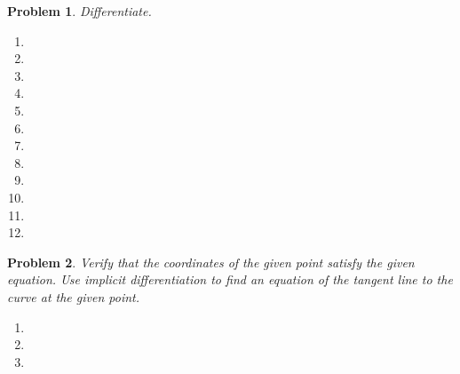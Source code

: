 \documentclass{article}
\renewcommand{\fcProblemRef}{\theproblem.\theenumi}
\newtheorem{problem}{Problem}
\begin{document}
\begin{problem}Differentiate.
\begin{multicols}{2}
\begin{enumerate}[ref={\fcProblemRef}]
\item 
\item 
\item 
\item 
\item 
\item 
\item 

\item 

\item 

\item 

\item 

\item 

\end{enumerate}
\end{multicols}
\end{problem} 


\begin{problem}Verify that the coordinates of the given point satisfy the given equation. Use implicit differentiation to find an equation of the tangent line to the curve at the given point.

\begin{enumerate}[ref={\fcProblemRef}]
\item 
\item 
\item


\end{enumerate}
\end{problem}

\end{document}
